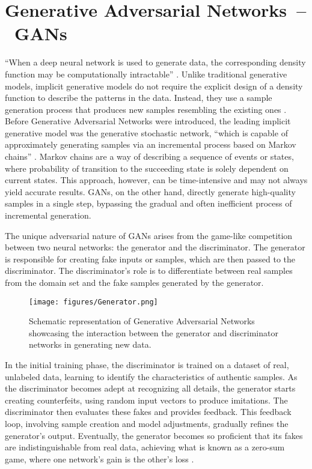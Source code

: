 \section{Generative Adversarial Networks~--~GANs}\label{GAN}

``When a deep neural network is used to generate data, the corresponding density function may be computationally intractable'' \citep{goodfellowGAN}. Unlike traditional generative models, implicit generative models do not require the explicit design of a density function to describe the patterns in the data. Instead, they use a sample generation process that produces new samples resembling the existing ones \citep{goodfellowGAN}. Before Generative Adversarial Networks were introduced, the leading implicit generative model was the generative stochastic network, ``which is capable of approximately generating samples via an incremental process based on Markov chains'' \citep{goodfellowGAN}. Markov chains are a way of describing a sequence of events or states, where probability of transition to the succeeding state is solely dependent on current states. This approach, however, can be time-intensive and may not always yield accurate results. GANs, on the other hand, directly generate high-quality samples in a single step, bypassing the gradual and often inefficient process of incremental generation.

The unique adversarial nature of GANs arises from the game-like competition between two neural networks: the generator and the discriminator. The generator is responsible for creating fake inputs or samples, which are then passed to the discriminator. The discriminator's role is to differentiate between real samples from the domain set and the fake samples generated by the generator.

\begin{figure}[ht]
\centering
  \texttt{[image: figures/Generator.png]}
  \caption{Schematic representation of Generative Adversarial Networks showcasing the interaction between the generator and discriminator networks in generating new data.}\label{fig:figureGAN}
\end{figure}

In the initial training phase, the discriminator is trained on a dataset of real, unlabeled data, learning to identify the characteristics of authentic samples. As the discriminator becomes adept at recognizing all details, the generator starts creating counterfeits, using random input vectors to produce imitations. The discriminator then evaluates these fakes and provides feedback. This feedback loop, involving sample creation and model adjustments, gradually refines the generator's output. Eventually, the generator becomes so proficient that its fakes are indistinguishable from real data, achieving what is known as a zero-sum game, where one network's gain is the other's loss \citep{goodfellowGAN}.

